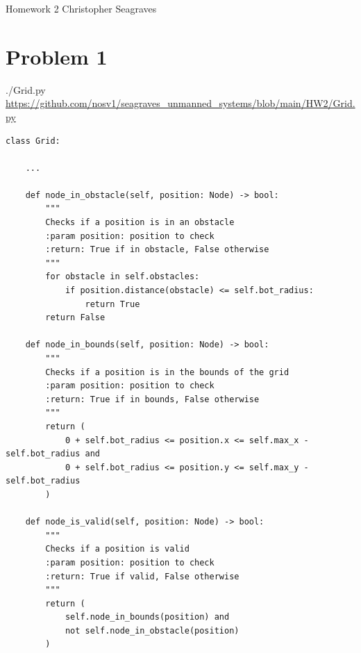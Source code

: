 \documentclass{article}
\begin{document}
    \raggedright
    Homework 2 \break
    Christopher Seagraves

    \section*{Problem 1}
    \begin{minipage}{\linewidth}
        \raggedright
        ./Grid.py \break
        \url{https://github.com/nosv1/seagraves_unmanned_systems/blob/main/HW2/Grid.py}
        \begin{lstlisting}
class Grid:

    ...

    def node_in_obstacle(self, position: Node) -> bool:
        """
        Checks if a position is in an obstacle
        :param position: position to check
        :return: True if in obstacle, False otherwise
        """
        for obstacle in self.obstacles:
            if position.distance(obstacle) <= self.bot_radius:
                return True
        return False
        
    def node_in_bounds(self, position: Node) -> bool:
        """
        Checks if a position is in the bounds of the grid
        :param position: position to check
        :return: True if in bounds, False otherwise
        """
        return (
            0 + self.bot_radius <= position.x <= self.max_x - self.bot_radius and
            0 + self.bot_radius <= position.y <= self.max_y - self.bot_radius
        )

    def node_is_valid(self, position: Node) -> bool:
        """
        Checks if a position is valid
        :param position: position to check
        :return: True if valid, False otherwise
        """
        return (
            self.node_in_bounds(position) and 
            not self.node_in_obstacle(position)
        )      
        \end{lstlisting}
    \end{minipage}
\end{document}
